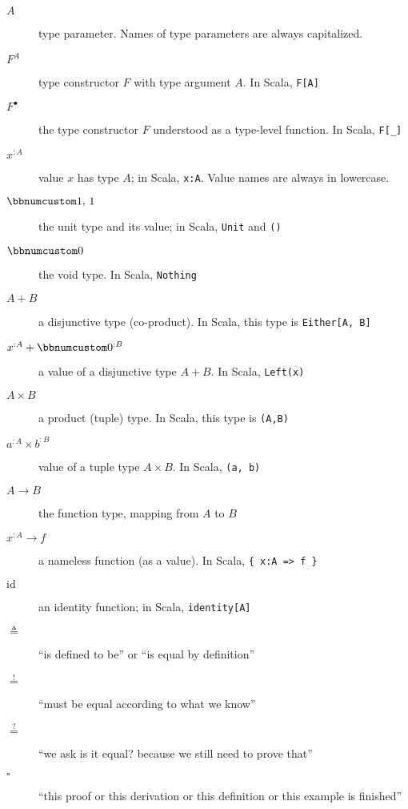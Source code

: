\begin{description}
\item [{$A$}] \textemdash{} type parameter. Names of type parameters are
always capitalized.
\item [{$F^{A}$}] \textemdash{} type constructor $F$ with type argument
$A$. In Scala, \lstinline!F[A]!
\item [{$F^{\bullet}$}] \textemdash{} the type constructor $F$ understood
as a type-level function. In Scala, \lstinline!F[_]! 
\item [{$x^{:A}$}] \textemdash{} value $x$ has type $A$; in Scala, \lstinline!x:A!.
Value names are always in lowercase.
\item [{$\bbnum 1,\,1$}] \textemdash{} the unit type and its value; in
Scala, \lstinline!Unit! and \lstinline!()!
\item [{$\bbnum 0$}] \textemdash{} the void type. In Scala, \lstinline!Nothing!
\item [{$A+B$}] \textemdash{} a disjunctive type (co-product). In Scala,
this type is \lstinline!Either[A, B]! 
\item [{$x^{:A}+\bbnum 0^{:B}$}] \textemdash{} a value of a disjunctive
type $A+B$. In Scala, \lstinline!Left(x)!
\item [{$A\times B$}] \textemdash{} a product (tuple) type. In Scala,
this type is \lstinline!(A,B)!
\item [{$a^{:A}\times b^{:B}$}] value of a tuple type $A\times B$. In
Scala, \lstinline!(a, b)!
\item [{$A\rightarrow B$}] \textemdash{} the function type, mapping from
$A$ to $B$
\item [{$x^{:A}\rightarrow f$}] \textemdash{} a nameless function (as
a value). In Scala, \lstinline!{ x:A => f }!
\item [{$\text{id}$}] \textemdash{} an identity function; in Scala, \lstinline!identity[A]!
\item [{$\triangleq$}] \textemdash{} \textsf{``}is defined to be\textsf{''} or \textsf{``}is equal
by definition\textsf{''}
\item [{$\overset{!}{=}$}] \textemdash{} \textsf{``}must be equal according to
what we know\textsf{''}
\item [{$\overset{?}{=}$}] \textemdash{} \textsf{``}we ask \textemdash{} is it
equal? \textemdash{} because we still need to prove that\textsf{''}
\item [{$\square$}] \textemdash{} \textsf{``}this proof or this derivation or
this definition or this example is finished\textsf{''}

\end{description}
